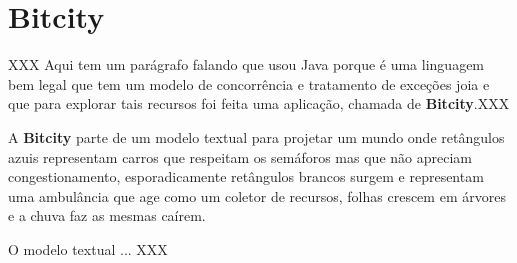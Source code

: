 \chapter{Bitcity}

XXX Aqui tem um parágrafo falando que usou Java porque é uma linguagem
bem legal que tem um modelo de concorrência e tratamento de exceções
joia e que para explorar tais recursos foi feita uma aplicação,
chamada de \textbf{Bitcity}.XXX

A \textbf{Bitcity} parte de um modelo textual para projetar um mundo
onde retângulos azuis representam carros que respeitam os semáforos
mas que não apreciam congestionamento, esporadicamente
retângulos brancos surgem e representam uma ambulância que age como um
coletor de recursos, folhas crescem em árvores e a chuva faz as mesmas
caírem.

O modelo textual ... XXX
